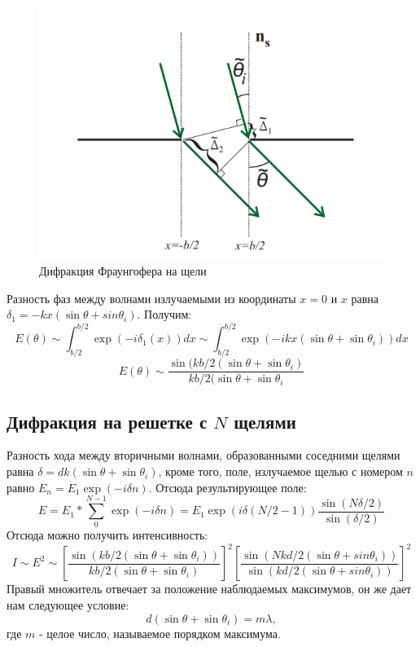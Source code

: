 \documentclass[a4paper,14pt]{extarticle}
\begin{document}
			\begin{figure}[h!]
				\centering
				\includegraphics[width=1\linewidth]{Diff1.png}
				\caption{Дифракция Фраунгофера на щели}
				\label{fig1}
			\end{figure}
			
			\newpage
			
			Разность фаз между волнами излучаемыми из координаты $x = 0$ и $x$ равна $\delta_1 = -k x (\sin{\theta} + sin{\theta_i})$. Получим:
			\begin{equation}
				E(\theta) \sim \int_{b/2}^{b/2}{\exp(-i \delta_1(x))dx} \sim \int_{b/2}^{b/2}{\exp(-i k x (\sin{\theta} + \sin{\theta_i})) dx}
			\end{equation}
			\begin{equation}
				E(\theta) \sim \frac{\sin(k b / 2 (\sin{\theta} + \sin{\theta_i})}{k b / 2 (\sin{\theta} + \sin{\theta_i}}
			\end{equation}
			\subsection{Дифракция на решетке с $N$ щелями}
			Разность хода между вторичными волнами, образованными соседними щелями равна $\delta = d k (\sin{\theta} + \sin{\theta_i})$, кроме того, поле, излучаемое щелью с номером $n$ равно $E_n = E_1 \exp(-i \delta n)$. Отсюда результирующее поле: 
			\begin{equation}
				E = E_1 * \sum_{0}^{N-1} \exp(-i \delta n) = E_1 \exp(i\delta(N/2 - 1)) \frac{\sin(N \delta /2)}{\sin(\delta /2)}
			\end{equation}
			Отсюда можно получить интенсивность:
			\begin{equation}
				I \sim E^2 \sim [\frac{\sin(k b / 2 (\sin{\theta} + \sin{\theta_i}))}{k b / 2 (\sin{\theta} + \sin{\theta_i})}]^2 [\frac{\sin(N k d / 2 (\sin{\theta} + sin{\theta_i}))}{\sin(k d / 2 (\sin{\theta} + sin{\theta_i}))}]^2
			\end{equation}
			Правый множитель отвечает за положение наблюдаемых максимумов, он же дает нам следующее условие:
			\begin{equation}
				d(\sin{\theta} + \sin{\theta_i}) = m \lambda,
			\end{equation}
			где $m$ - целое число, называемое порядком максимума. 
\end{document}
